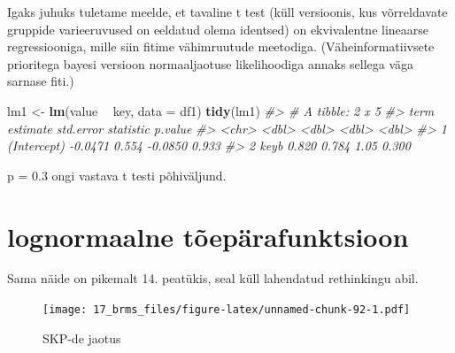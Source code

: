 \documentclass[]{book}
\newenvironment{Shaded}{\begin{snugshade}}{\end{snugshade}}
\newcommand{\KeywordTok}[1]{\textcolor[rgb]{0.13,0.29,0.53}{\textbf{#1}}}
\newcommand{\DataTypeTok}[1]{\textcolor[rgb]{0.13,0.29,0.53}{#1}}
\newcommand{\DecValTok}[1]{\textcolor[rgb]{0.00,0.00,0.81}{#1}}
\newcommand{\StringTok}[1]{\textcolor[rgb]{0.31,0.60,0.02}{#1}}
\newcommand{\CommentTok}[1]{\textcolor[rgb]{0.56,0.35,0.01}{\textit{#1}}}
\newcommand{\OperatorTok}[1]{\textcolor[rgb]{0.81,0.36,0.00}{\textbf{#1}}}
\newcommand{\NormalTok}[1]{#1}
\begin{document}
Igaks juhuks tuletame meelde, et tavaline t test (küll versioonis, kus
võrreldavate gruppide varieeruvused on eeldatud olema identsed) on
ekvivalentne lineaarse regressiooniga, mille siin fitime vähimruutude
meetodiga. (Väheinformatiivsete prioritega bayesi versioon
normaaljaotuse likelihoodiga annaks sellega väga sarnase fiti.)

\begin{Shaded}
\begin{Highlighting}[]
\NormalTok{lm1 <-}\StringTok{ }\KeywordTok{lm}\NormalTok{(value }\OperatorTok{~}\StringTok{ }\NormalTok{key, }\DataTypeTok{data =}\NormalTok{ df1)}
\KeywordTok{tidy}\NormalTok{(lm1)}
\CommentTok{#> # A tibble: 2 x 5}
\CommentTok{#>   term        estimate std.error statistic p.value}
\CommentTok{#>   <chr>          <dbl>     <dbl>     <dbl>   <dbl>}
\CommentTok{#> 1 (Intercept)  -0.0471     0.554   -0.0850   0.933}
\CommentTok{#> 2 keyb          0.820      0.784    1.05     0.300}
\end{Highlighting}
\end{Shaded}

p = 0.3 ongi vastava t testi põhiväljund.

\section{lognormaalne
tõepärafunktsioon}\label{lognormaalne-toeparafunktsioon}

Sama näide on pikemalt 14. peatükis, seal küll lahendatud rethinkingu
abil.

\begin{Shaded}
\end{Shaded}

\begin{figure}
\centering
\texttt{[image: 17\_brms\_files/figure-latex/unnamed-chunk-92-1.pdf]}
\caption{\label{fig:unnamed-chunk-92}SKP-de jaotus}
\end{figure}
\end{document}
